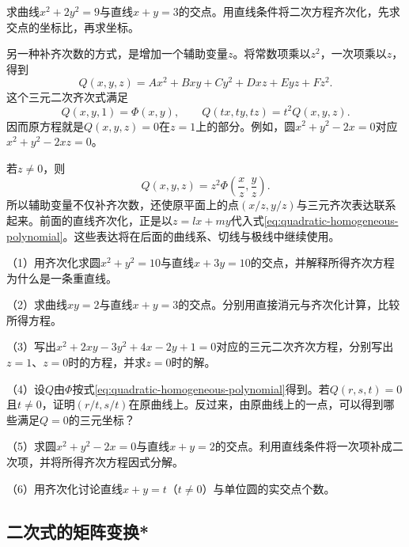 \begin{example}\label{ex:quadratic-line-homogenization}
求曲线\(x^2+2y^2=9\)与直线\(x+y=3\)的交点。用直线条件将二次方程齐次化，先求交点的坐标比，再求坐标。
\end{example}

另一种补齐次数的方式，是增加一个辅助变量\(z\)。将常数项乘以\(z^2\)，一次项乘以\(z\)，得到
\begin{equation}\label{eq:quadratic-homogeneous-polynomial}
    Q(x,y,z)=Ax^2+Bxy+Cy^2+Dxz+Eyz+Fz^2 .
\end{equation}
这个三元二次齐次式满足
\begin{equation*}
    Q(x,y,1)=\Phi(x,y) , \qquad
    Q(tx,ty,tz)=t^2Q(x,y,z) .
\end{equation*}
因而原方程就是\(Q(x,y,z)=0\)在\(z=1\)上的部分。例如，圆\(x^2+y^2-2x=0\)对应\(x^2+y^2-2xz=0\)。

若\(z\ne0\)，则
\begin{equation}\label{eq:quadratic-homogeneous-recovery}
    Q(x,y,z)=z^2\Phi\left(\frac{x}{z},\frac{y}{z}\right) .
\end{equation}
所以辅助变量不仅补齐次数，还使原平面上的点\((x/z,y/z)\)与三元齐次表达联系起来。前面的直线齐次化，正是以\(z=lx+my\)代入式\eqref{eq:quadratic-homogeneous-polynomial}。这些表达将在后面的曲线系、切线与极线中继续使用。

\begin{exercise}
\mbox{}

（1）用齐次化求圆\(x^2+y^2=10\)与直线\(x+3y=10\)的交点，并解释所得齐次方程为什么是一条重直线。

（2）求曲线\(xy=2\)与直线\(x+y=3\)的交点。分别用直接消元与齐次化计算，比较所得方程。

（3）写出\(x^2+2xy-3y^2+4x-2y+1=0\)对应的三元二次齐次方程，分别写出\(z=1\)、\(z=0\)时的方程，并求\(z=0\)时的解。

（4）设\(Q\)由\(\Phi\)按式\eqref{eq:quadratic-homogeneous-polynomial}得到。若\(Q(r,s,t)=0\)且\(t\ne0\)，证明\((r/t,s/t)\)在原曲线上。反过来，由原曲线上的一点，可以得到哪些满足\(Q=0\)的三元坐标？

（5）求圆\(x^2+y^2-2x=0\)与直线\(x+y=2\)的交点。利用直线条件将一次项补成二次项，并将所得齐次方程因式分解。

（6）用齐次化讨论直线\(x+y=t\)（\(t\ne0\)）与单位圆的实交点个数。
\end{exercise}

\newpage
\subsection{二次式的矩阵变换*}
\label{subsec:quadratic-matrix-transformation}

